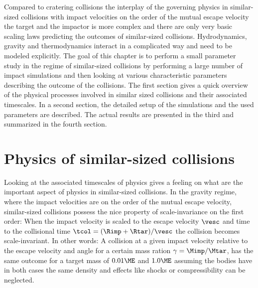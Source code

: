 Compared to cratering collisions the interplay of the governing physics in similar-sized collisions with impact velocities on the order of the mutual escape velocity the target and the impactor is more complex and there are only very basic scaling laws predicting the outcomes of similar-sized collisions. Hydrodynamics, gravity and thermodynamics interact in a complicated way and need to be modeled explicitly. The goal of this chapter is to perform a small parameter study in the regime of similar-sized collisions by performing a large number of impact simulations and then looking at various characteristic parameters describing the outcome of the collisions. The first section gives a quick overview of the physical processes involved in similar sized collisions and their associated timescales. In a second section, the detailed setup of the simulations and the used parameters are described. The actual results are presented in the third and summarized in the fourth section.

\section{Physics of similar-sized collisions}
\label{ch03_sec01}
Looking at the associated timescales of physics gives a feeling on what are the important aspect of physics in similar-sized collisions. In the gravity regime, where the impact velocities are on the order of the mutual escape velocity, similar-sized collisions possess the nice property of scale-invariance on the first order: When the impact velocity is scaled to the escape velocity $\vesc$ and time to the collisional time $\tcol = ( \Rimp + \Rtar ) / \vesc$ the collision becomes scale-invariant. In other words: A collision at a given impact velocity relative to the escape velocity and angle for a certain mass ration $\gamma = \Mimp / \Mtar$, has the same outcome for a target mass of $0.01 \ME$ and $1.0 \ME$ assuming the bodies have in both cases the same density and effects like shocks or compressibility can be neglected.


